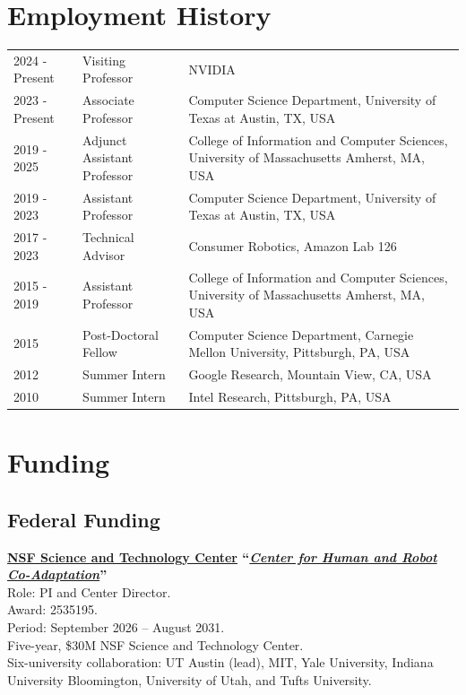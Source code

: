 \documentclass[Times]{article}
\begin{document}
\section*{Employment History}
\begin{longtable}{@{}p{2.3cm} >{\raggedright\arraybackslash}p{3.4cm} >{\raggedright\arraybackslash}p{\dimexpr\textwidth-5.7cm-4\tabcolsep\relax}@{}}
  2024 - Present & Visiting Professor & NVIDIA \\
  2023 - Present & Associate Professor & Computer Science Department,
  University of Texas at Austin, TX, USA \\
  2019 - 2025 & Adjunct Assistant Professor &  College of Information and Computer Sciences, University of Massachusetts Amherst, MA, USA\\
  2019 - 2023 & Assistant Professor & Computer Science Department,
  University of Texas at Austin, TX, USA \\
  2017 - 2023 & Technical Advisor &  Consumer Robotics, Amazon Lab 126\\
  2015 - 2019  & Assistant Professor &  College of Information and Computer Sciences, University of Massachusetts Amherst, MA, USA\\
  2015 & Post-Doctoral Fellow &  Computer Science Department, Carnegie Mellon University, Pittsburgh, PA, USA\\
  2012 & Summer Intern &  Google Research, Mountain View, CA, USA\\
  2010 & Summer Intern &  Intel Research, Pittsburgh, PA, USA\\
\end{longtable}


\section*{Funding}
\begingroup
{}

\subsection*{Federal Funding}

\textbf{\href{https://www.nsf.gov/news/nsf-launches-three-new-science-technology-centers-90m}{NSF Science and Technology Center} ``\emph{\href{http://hrc-stc.org/}{Center for Human and Robot Co-Adaptation}}''}\\
Role: PI and Center Director.\\
Award: 2535195.\\
Period: September 2026 -- August 2031.\\
Five-year, \$30M NSF Science and Technology Center.\\
Six-university collaboration: UT Austin (lead), MIT, Yale University,
Indiana University Bloomington, University of Utah, and Tufts University.
\par\vspace{2\baselineskip}
\end{document}
